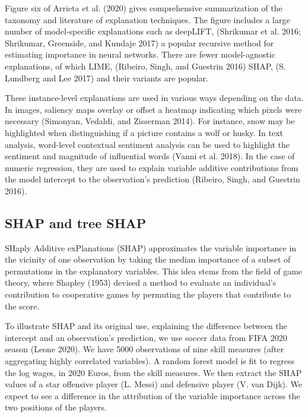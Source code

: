 \documentclass[
  article]{article}
\begin{document}
Figure six of Arrieta et al. (2020) gives comprehensive summarization of the taxonomy and literature of explanation techniques. The figure includes a large number of model-specific explanations such as deepLIFT, (Shrikumar et al. 2016; Shrikumar, Greenside, and Kundaje 2017) a popular recursive method for estimating importance in neural networks. There are fewer model-agnostic explanations, of which LIME, (Ribeiro, Singh, and Guestrin 2016) SHAP, (S. Lundberg and Lee 2017) and their variants are popular.

These instance-level explanations are used in various ways depending on the data. In images, saliency maps overlay or offset a heatmap indicating which pixels were necessary (Simonyan, Vedaldi, and Zisserman 2014). For instance, snow may be highlighted when distinguishing if a picture contains a wolf or husky. In text analysis, word-level contextual sentiment analysis can be used to highlight the sentiment and magnitude of influential words (Vanni et al. 2018). In the case of numeric regression, they are used to explain variable additive contributions from the model intercept to the observation's prediction (Ribeiro, Singh, and Guestrin 2016).

\hypertarget{shap-and-tree-shap}{%
\subsection{SHAP and tree SHAP}\label{shap-and-tree-shap}}

SHaply Additive exPlanations (SHAP) approximates the variable importance in the vicinity of one observation by taking the median importance of a subset of permutations in the explanatory variables. This idea stems from the field of game theory, where Shapley (1953) devised a method to evaluate an individual's contribution to cooperative games by permuting the players that contribute to the score.

To illustrate SHAP and its original use, explaining the difference between the intercept and an observation's prediction, we use soccer data from FIFA 2020 season (Leone 2020). We have 5000 observations of nine skill measures (after aggregating highly correlated variables). A random forest model is fit to regress the log wages, in 2020 Euros, from the skill measures. We then extract the SHAP values of a star offensive player (L. Messi) and defensive player (V. van Dijk). We expect to see a difference in the attribution of the variable importance across the two positions of the players.
\end{document}
